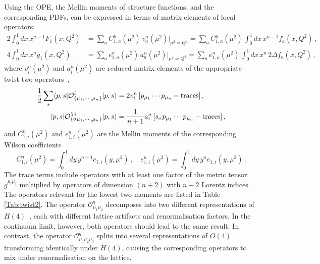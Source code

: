 Using the OPE, the Mellin moments of structure functions, and the corresponding PDFs, can be expressed in terms of matrix elements of local operators:
\begin{align}
\!\!\!2 \int_0^1 dx\, x^{n-1} F_1(x,Q^2) &= \sum_a C_{1,a}^n(\mu^2)\, v_a^n(\mu^2)|_{\mu^2=Q^2} = \sum_a C_{1,a}^n(\mu^2)\, \int_0^1 dx\, x^{n-1} f_a(x,Q^2)\,,\\
4 \int_0^1 dx\, x^n g_1(x,Q^2) &= \sum_a e_{1,a}^n(\mu^2)\, a_a^n(\mu^2)|_{\mu^2=Q^2} = \sum_a e_{1,a}^n(\mu^2)\, \int_0^1 dx\, x^n\, 2 \Delta f_a(x,Q^2)\,,
\end{align}
where $v_i^n(\mu^2)$ and $a_i^n(\mu^2)$ are reduced matrix elements of the appropriate twist-two operators~\cite{Gockeler:1995wg},
\begin{align}
\frac{1}{2} \sum_s \langle p,s|\mathcal{O}^i_{\{\mu_1,\cdots,\mu_n\}}|p,s\rangle = {} & 2 v_i^n\, [p_{\mu_1}\cdots p_{\mu_n} - {\rm traces}] \,, \label{eq:twist2me}\\
\langle p,s|\mathcal{O}^{5\,i}_{\{\sigma \mu_1,\cdots,\mu_n\}}|p,s\rangle = {} & \frac{1}{n+1} a_i^n\, [s_\sigma p_{\mu_1}\cdots p_{\mu_n} - {\rm traces}]\,,
\end{align}
and $C_{1,i}^n(\mu^2)$ and $e_{1,i}^n(\mu^2)$ are the Mellin moments of the corresponding Wilson coefficients
\begin{equation}
C_{1,i}^n(\mu^2) = \int_0^1 dy\, y^{n-1} c_{1,i}(y,\mu^2)\,, \quad
e_{1,i}^n(\mu^2) = \int_0^1 dy\, y^n e_{1,i}(y,\mu^2)\,.
\end{equation}
The trace terms include operators with at least one factor of the metric tensor $g^{\mu_i \mu_j}$ multiplied by
operators of dimension $(n+2)$ with $n-2$ Lorentz indices. The operators relevant for the lowest two moments are listed in Table \ref{Tab:twist2}. The operator $\mathcal{O}^q_{\mu_1\mu_2}$ decomposes into two different representations of $H(4)$~\cite{Gockeler:1996mu}, each with different lattice artifacts and renormalisation factors. In the continuum limit, however, both operators should lead to the same result. In contrast, the operator $\mathcal{O}^q_{\mu_1\mu_2\mu_3}$ 
splits into several representations of $O(4)$ transforming identically 
under $H(4)$, causing the corresponding operators to mix under renormalisation 
on the lattice.

